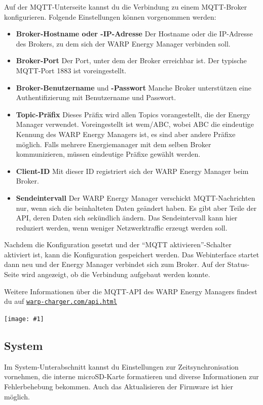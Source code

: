 \documentclass[a4paper,10pt]{article}
\newcommand{\gfx}[1]{\texttt{[image: \#1]}}
\newcommand\rurl[2]{%
  \href{#1}{\nolinkurl{#2}}%
}
\begin{document}
\begin{multicols*}{2}
	Auf der MQTT-Unterseite kannst du die Verbindung zu einem MQTT-Broker konfigurieren. Folgende Einstellungen können vorgenommen werden:
	\begin{itemize}
		\item \textbf{Broker-Hostname oder -IP-Adresse} Der Host\-name oder die
		IP-Adresse des Brokers, zu dem sich der WARP Energy Manager verbinden soll.
		\item \textbf{Broker-Port} Der Port, unter dem der Broker erreichbar ist. Der typische MQTT-Port 1883 ist voreingestellt.
		\item \textbf{Broker-Benutzername} und \textbf{-Passwort} Manche Broker unterstützen eine Authentifizierung mit Benutzername und Passwort.
		\item \textbf{Topic-Präfix} Dieses Präfix wird allen Topics vorangestellt, die der Energy Manager verwendet.
		      Voreingestellt ist wem/ABC, wobei ABC die eindeutige Kennung des
			  WARP Energy Managers ist,
		      es sind aber andere Präfixe möglich.
		      Falls mehrere Energiemanager mit dem selben Broker kommunizieren,
		      müssen eindeutige Präfixe gewählt werden.
		\item \textbf{Client-ID} Mit dieser ID registriert sich der WARP Energy Manager beim Broker.
		\item \textbf{Sendeintervall} Der WARP Energy Manager verschickt MQTT-Nachrichten nur, wenn sich die beinhalteten Daten geändert haben.
			Es gibt aber Teile der API, deren Daten sich sekündlich ändern. Das Sendeintervall kann hier reduziert werden, wenn weniger Netzwerktraffic
			erzeugt werden soll.
	\end{itemize}

	Nachdem die Konfiguration gesetzt und der \enquote{MQTT aktivieren}-Schalter aktiviert ist, kann die Konfiguration gespeichert werden.
	Das Webinterface startet dann neu und der Energy Manager verbindet sich zum Broker.
	Auf der Status-Seite wird angezeigt, ob die Verbindung aufgebaut werden konnte.

	Weitere Informationen über die MQTT-API des WARP Energy Managers findest du auf \rurl{https://warp-charger.com/api.html}{warp-charger.com/api.html}

	\gfx{./img/resized/web_mqtt}

	\subsection{System}
	Im System-Unterabschnitt kannst du Einstellungen zur Zeitsynchronisation
	vornehmen, die interne microSD-Karte formatieren und diverse Informationen zur Fehlerbehebung
	bekommen. Auch das Aktualisieren der Firmware ist hier möglich.


\end{multicols*}
\end{document}
